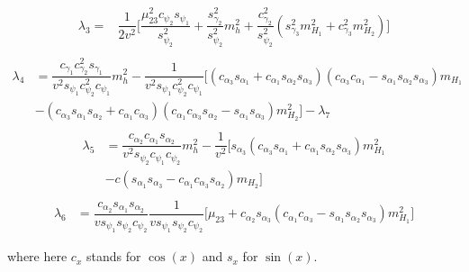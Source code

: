 %
\begin{equation}
\begin{split}
\lambda_3  = & \dfrac{1}{2 v^2} \Bigg[ \dfrac{ \mu_{23}^2 c_{\psi_2} s_{\psi_1} }{s_{\psi_2}^2} + \dfrac{s_{\gamma_2}^2}{s_{\psi_2}^2} m_h^2 +  \dfrac{ c^2_{\gamma_2} }{s^2_{\psi_2}} \left( s^2_{\gamma_3}  m_{H_1}^2 + c_{\gamma_3}^2 m_{H_2}^2 \right) \Bigg]  \\ 
\end{split} 
\end{equation}
%
\begin{equation}
\begin{split}
\lambda_4 & = \dfrac{c_{\gamma_1} c_{\gamma_2}^2 s_{\gamma_1}}{ v^2 s_{\psi_1} c_{\psi_2}^2 c_{\psi_1} } m_h^2 - \dfrac{1}{v^2 s_{\psi_1} c_{\psi_2}^2 c_{\psi_1}} \Bigg[ ( c_{\alpha_3} s_{\alpha_1} + c_{\alpha_1} s_{\alpha_2} s_{\alpha_3} )( c_{\alpha_3} c_{\alpha_1} - s_{\alpha_1} s_{\alpha_2} s_{\alpha_3} ) m_{H_1} \\ & - ( c_{\alpha_3} s_{\alpha_1} s_{\alpha_2}  + c_{\alpha_1}  c_{\alpha_3}  )( c_{\alpha_1} c_{\alpha_3} s_{\alpha_2}  - s_{\alpha_1} s_{\alpha_3}  ) m_{H_2}^2  \Bigg] - \lambda_7  \\
\end{split} 
\end{equation}
%
\begin{equation}
\begin{split}
\lambda_5 & = \dfrac{c_{\alpha_2} c_{\alpha_1} s_{\alpha_2}}{v^2 s_{\psi_2} c_{\psi_1} c_{\psi_2}} m_h^2 - \dfrac{1}{v^2} \Bigg[ s_{\alpha_3} ( c_{\alpha_3}  s_{\alpha_1}  + c_{\alpha_1}  s_{\alpha_2}  s_{\alpha_3}  ) m_{H_1}^2 \\ & - c ( s_{\alpha_1}  s_{\alpha_3}  - c_{\alpha_1}  c_{\alpha_3}  s_{\alpha_2}  ) m_{H_2} \Bigg] \\ 
\end{split} 
\end{equation}
%
\begin{equation}
\begin{split}
\lambda_6 & = \dfrac{  c_{\alpha_2} s_{\alpha_1} s_{\alpha_2}  }{ v s_{\psi_1} s_{\psi_2} c_{\psi_2}  } \dfrac{1}{v s_{\psi_1} s_{\psi_2} c_{\psi_2}  } \Bigg[ \mu_{23} + c_{\alpha_2} s_{\alpha_3} ( c_{\alpha_1} c_{\alpha_3}  - s_{\alpha_1} s_{\alpha_2} s_{\alpha_3} )  m_{H_1}^2 \Bigg] 
\end{split} 
\end{equation}

where here $c_x$ stands for $\cos(x)$ and $s_x$ for $\sin(x)$. 

